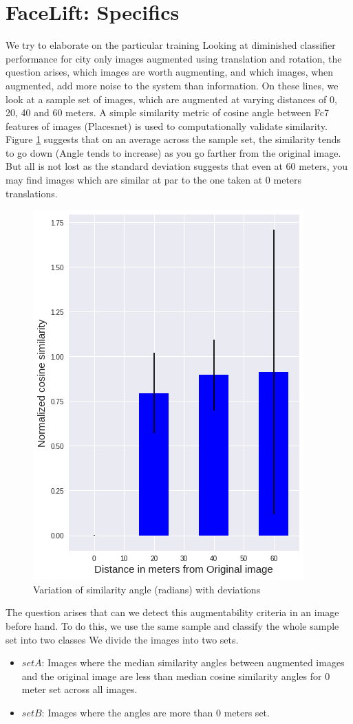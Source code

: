 \section{ FaceLift:  Specifics}
We try to elaborate on the particular training 
Looking at diminished classifier performance for city only images augmented using translation and rotation, the question arises, which images are worth augmenting, and which images, when augmented, add more noise to the system than information. 
On these lines, we look at a sample set of images, which are augmented at varying distances of 0, 20, 40 and 60 meters. A simple similarity metric of cosine angle between Fc7 features of images (Placesnet) is used to computationally validate similarity. 
Figure \ref{fig:normedCosine} suggests that on an average across the sample set, the similarity tends to go down (Angle tends to increase) as you go farther from the original image. But all is not lost as the standard deviation suggests that even at 60 meters, you may find images which are similar at par to the one taken at 0 meters translations.


\begin{figure}[ht]
	\centering
	\includegraphics[width=0.5\columnwidth]{Plot/Normed_cosineSim_Aug_5000.png}
	\caption{Variation of similarity angle (radians) with deviations}
	\label{fig:normedCosine}
\end{figure}



The question arises that can we detect this augmentability criteria in an image before hand. To do this, we use the same sample and classify the whole sample set into two classes
We divide the images into two sets. 
\begin{itemize}
	\item $set A$: Images where the median similarity angles between augmented images and the original image are less than median cosine similarity angles for 0 meter set across all images. 
	\item $set B$: Images where the angles are more than 0 meters set. 
\end{itemize}

